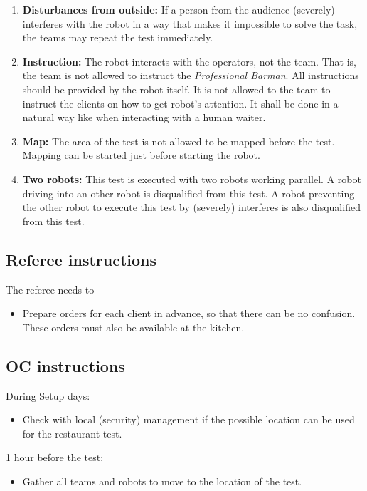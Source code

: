 \begin{enumerate}[nosep]
	\item \textbf{Disturbances from outside:} If a person from the audience (severely) interferes with the robot in a way that makes it impossible to solve the task, the teams may repeat the test immediately.

	\item \textbf{Instruction:} The robot interacts with the operators, not the team. That is, the team is not allowed to instruct the \textit{Professional Barman}. All instructions should be provided by the robot itself.
	It is not allowed to the team to instruct the clients on how to get robot's attention. It shall be done in a natural way like when interacting with a human waiter.

    \item \textbf{Map:} The area of the test is not allowed to be mapped before the test. Mapping can be started just before starting the robot.

    \item \textbf{Two robots:} This test is executed with two robots working parallel. A robot driving into an other robot is disqualified from this test. A robot preventing the other robot to execute this test by (severely) interferes is also disqualified from this test.

\end{enumerate}

\subsection{Referee instructions}

The referee needs to
\begin{itemize}
	\item Prepare orders for each client in advance, so that there can be no confusion. These orders must also be available at the kitchen.
\end{itemize}

\subsection{OC instructions}
During Setup days:
\begin{itemize}[nosep]
	\item Check with local (security) management if the possible location can be used for the restaurant test.
\end{itemize}

1 hour before the test:
\begin{itemize}[nosep]
	\item Gather all teams and robots to move to the location of the test.
\end{itemize}

% 


